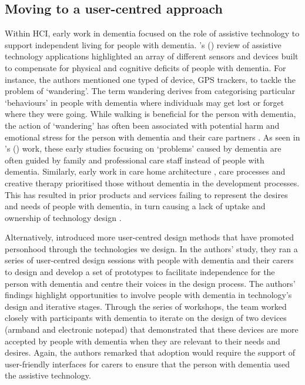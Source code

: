 \subsection{Moving to a user-centred approach}
\label{BL:Tech}
Within HCI, early work in dementia focused on the role of assistive technology to support independent living for people with dementia. \citeauthor{bharucha2009intelligent}'s (\citeyear{bharucha2009intelligent}) review of assistive technology applications highlighted an array of different sensors and devices built to compensate for physical and cognitive deficits of people with dementia. For instance, the authors mentioned one typed of device, GPS trackers, to tackle the problem of `wandering'. The term wandering derives from categorising particular `behaviours' in people with dementia where individuals may get lost or forget where they were going. While walking is beneficial for the person with dementia, the action of `wandering' has often been associated with potential harm and emotional stress for the person with dementia and their care partners \citep{robinson2007balancing}. As seen in \citeauthor{bharucha2009intelligent}'s (\citeyear{bharucha2009intelligent}) work, these early studies focusing on `problems' caused by dementia are often guided by family and professional care staff instead of people with dementia. Similarly, early work in care home architecture \citep{torrington2006has}, care processes \citep{rabins2006practical} and creative therapy \citep{schmitt2006creative} prioritised those without dementia in the development processes. This has resulted in prior products and services failing to represent the desires and needs of people with dementia, in turn causing a lack of uptake and ownership of technology design \citep{gibson2019personalisation}. 

Alternatively, \cite{robinson2009keeping} introduced more user-centred design methods that have promoted personhood through the technologies we design. In the authors' study, they ran a series of user-centred design sessions with people with dementia and their carers to design and develop a set of prototypes to facilitate independence for the person with dementia and centre their voices in the design process. The authors' findings highlight opportunities to involve people with dementia in technology's design and iterative stages. Through the series of workshops, the team worked closely with participants with dementia to iterate on the design of two devices (armband and electronic notepad) that demonstrated that these devices are more accepted by people with dementia when they are relevant to their needs and desires. Again, the authors  remarked that adoption would require the support of user-friendly interfaces for carers to ensure that the person with dementia used the assistive technology. 

